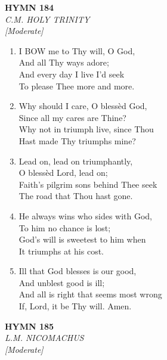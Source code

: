 \documentclass[11pt,a4paper]{article}
\begin{document}
\newpage
\begin{center}
    {\Large \textbf{HYMN 184}}
    \\
    \textit{C.M. HOLY TRINITY}
    \\
    \textit{\small [Moderate]}
\end{center}
\vspace{1em}

\begin{enumerate}
    \item I BOW me to Thy will, O God, \\
        And all Thy ways adore; \\
        And every day I live I'd seek \\
        To please Thee more and more.

    \item Why should I care, O bless\`ed God, \\
        Since all my cares are Thine? \\
        Why not in triumph live, since Thou \\
        Hast made Thy triumphs mine?

    \item Lead on, lead on triumphantly, \\
        O bless\`ed Lord, lead on; \\
        Faith's pilgrim sons behind Thee seek \\
        The road that Thou hast gone.

    \item He always wins who sides with God, \\
        To him no chance is lost; \\
        God's will is sweetest to him when \\
        It triumphs at his cost.

    \item Ill that God blesses is our good, \\
        And unblest good is ill; \\
        And all is right that seems most wrong \\
        If, Lord, it be Thy will. Amen.

\end{enumerate}

\newpage
\begin{center}
    {\Large \textbf{HYMN 185}}
    \\
    \textit{L.M. NICOMACHUS}
    \\
    \textit{\small [Moderate]}
\end{center}
\vspace{1em}
\end{document}
